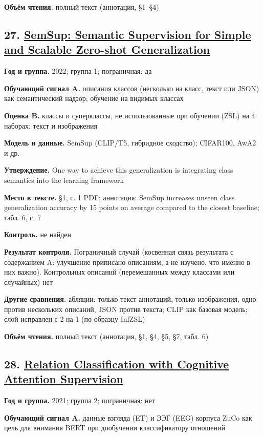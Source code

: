 \textbf{Объём чтения.} полный текст (аннотация, §1–§4)


\subsection*{27. \href{https://doi.org/10.48550/arxiv.2202.13100}{SemSup: Semantic Supervision for Simple and Scalable Zero-shot Generalization}}

\textbf{Год и группа.} 2022; группа 1; пограничная: да

\textbf{Обучающий сигнал A.} описания классов (несколько на класс, текст или JSON) как семантический надзор; обучение на видимых классах

\textbf{Оценка B.} классы и суперклассы, не использованные при обучении (ZSL) на 4 наборах: текст и изображения

\textbf{Модель и данные.} SemSup (CLIP/T5, гибридное сходство); CIFAR100, AwA2 и др.

\textbf{Утверждение.} One way to achieve this generalization is integrating class semantics into the learning framework

\textbf{Место в тексте.} §1, с. 1 PDF; аннотация: SemSup increases unseen class generalization accuracy by 15 points on average compared to the closest baseline; табл. 6, с. 7

\textbf{Контроль.} не найден

\textbf{Результат контроля.} Пограничный случай (косвенная связь результата с содержанием A: улучшение приписано описаниям, а не изучено, что именно в них важно). Контрольных описаний (перемешанных между классами или случайных) нет

\textbf{Другие сравнения.} абляции: только текст аннотаций, только изображения, одно против нескольких описаний, JSON против текста; CLIP как базовая модель; слой исправлен с 2 на 1 (по образцу InfZSL)

\textbf{Объём чтения.} полный текст (аннотация, §1, §4, §5, §7, табл. 6)


\subsection*{28. \href{https://doi.org/10.18653/v1/2021.cmcl-1.26}{Relation Classification with Cognitive Attention Supervision}}

\textbf{Год и группа.} 2021; группа 2; пограничная: нет

\textbf{Обучающий сигнал A.} данные взгляда (ET) и ЭЭГ (EEG) корпуса ZuCo как цель для внимания BERT при дообучении классификатору отношений

